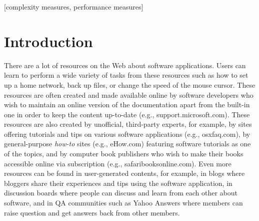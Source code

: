 \documentclass{www2010-submission}
\begin{document}
\begin{abstract}
This paper provides a sample of a LaTeX document which conforms,
somewhat loosely, to the formatting guidelines for
ACM SIG Proceedings. It is an {\em alternate} style which produces
a {\em tighter-looking} paper and was designed in response to
concerns expressed, by authors, over page-budgets.
It complements the document \textit{Author's (Alternate) Guide to
Preparing ACM SIG Proceedings Using \LaTeX$2_\epsilon$\ and Bib\TeX}.
This source file has been written with the intention of being
compiled under \LaTeX$2_\epsilon$\ and BibTeX.
The developers have tried to include every imaginable sort
of ``bells and whistles", such as a subtitle, footnotes on
title, subtitle and authors, as well as in the text, and
every optional component (e.g. Acknowledgments, Additional
Authors, Appendices), not to mention examples of
equations, theorems, tables and figures.
To make best use of this sample document, run it through \LaTeX\
and BibTeX, and compare this source code with the printed
output produced by the dvi file. A compiled PDF version
is available on the web page to help you with the
`look and feel'.
\end{abstract}

[complexity measures,
performance measures]



\section{Introduction}

There are a lot of resources on the Web about software
applications. Users can learn to perform a wide variety of tasks from
these resources such as how to set up a home network, back up files,
or change the speed of the mouse cursor. These resources are often
created and made available online by software developers who wish to
maintain an online version of the documentation apart from the
built-in one in order to keep the content up-to-date (e.g.,
support.microsoft.com). These resources are also created by
unofficial, third-party experts, for example, by sites offering
tutorials and tips on various software applications (e.g.,
osxfaq.com), by general-purpose \emph{how-to} sites (e.g., eHow.com)
featuring software tutorials as one of the topics, and by computer
book publishers who wish to make their books accessible online via
subscription (e.g., safaribooksonline.com). Even more resources can be
found in user-generated contents, for example, in blogs where bloggers
share their experiences and tips using the software application, in
discussion boards where people can discuss and learn from each other
about software, and in QA communities such as Yahoo Answers where
members can raise question and get answers back from other members.
\end{document}

